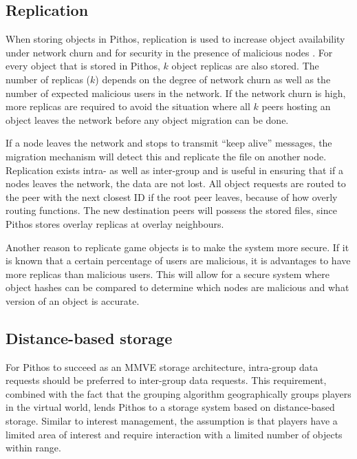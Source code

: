\subsection{Replication}
\label{store_retrieve}

When storing objects in Pithos, replication is used to increase object availability under network churn and for security in the presence of malicious
nodes \cite{storage_and_chaching_PAST}. For every object that is stored in Pithos, $k$ object replicas are also stored. The number of replicas ($k$)
depends on the degree of network churn as well as the number of expected malicious users in the network. If the network churn is high, more replicas
are required to avoid the situation where all $k$ peers hosting an object leaves the network before any object migration can be done.

If a node leaves the network and stops to transmit ``keep alive'' messages, the migration mechanism will detect this and replicate the file on
another node. Replication exists intra- as well as inter-group and is useful in ensuring that if a nodes leaves the network, the data are not lost.
All object requests are routed to the peer with the next closest ID if the root peer leaves, because of how overly routing functions. The new
destination peers will possess the stored files, since Pithos stores overlay replicas at overlay neighbours.

Another reason to replicate game objects is to make the system more secure. If it is known that a certain percentage of users are malicious, it is
advantages to have more replicas than malicious users. This will allow for a secure system where object hashes can be compared to determine which
nodes are malicious and what version of an object is accurate.

\subsection{Distance-based storage}
\label{distance_based}

For Pithos to succeed as an MMVE storage architecture, intra-group data requests should be preferred to inter-group data requests. This requirement,
combined with the fact that the grouping algorithm geographically groups players in the virtual world, lends Pithos to a storage system based on
distance-based storage. Similar to interest management, the assumption is that players have a limited area of interest and require interaction with a
limited number of objects within range.

